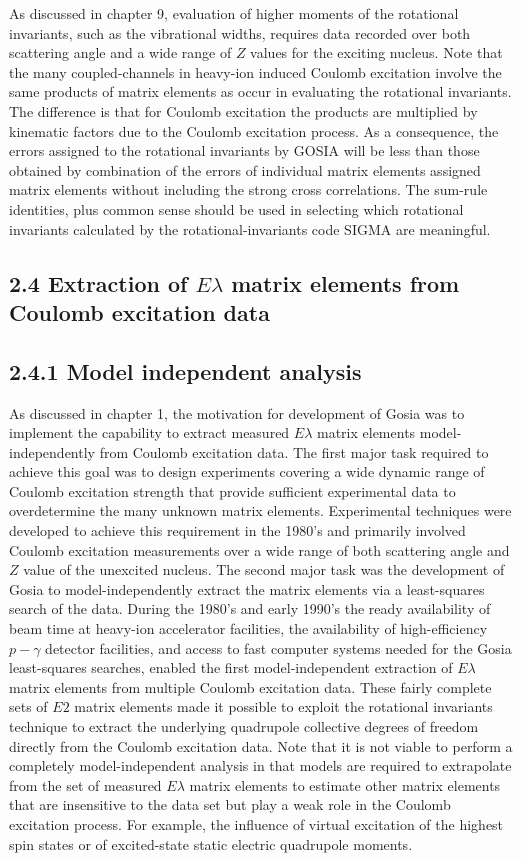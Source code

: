 \documentclass[10pt]{article}
\begin{document}
As discussed in chapter 9, evaluation of higher moments of the rotational invariants, such as the vibrational widths, requires data recorded over both scattering angle and a wide range of $Z$ values for the exciting nucleus. Note that the many coupled-channels in heavy-ion induced Coulomb excitation involve the same products of matrix elements as occur in evaluating the rotational invariants. The difference is that for Coulomb excitation the products are multiplied by kinematic factors due to the Coulomb excitation process. As a consequence, the errors assigned to the rotational invariants by GOSIA will be less than those obtained by combination of the errors of individual matrix elements assigned matrix elements without including the strong cross correlations. The sum-rule identities, plus common sense should be used in selecting which rotational invariants calculated by the rotational-invariants code SIGMA are meaningful.

\subsection*{2.4 Extraction of $E \lambda$ matrix elements from Coulomb excitation data}
\subsection*{2.4.1 Model independent analysis}
As discussed in chapter 1, the motivation for development of Gosia was to implement the capability to extract measured $E \lambda$ matrix elements model-independently from Coulomb excitation data. The first major task required to achieve this goal was to design experiments covering a wide dynamic range of Coulomb excitation strength that provide sufficient experimental data to overdetermine the many unknown matrix elements. Experimental techniques were developed to achieve this requirement in the 1980's and primarily involved Coulomb excitation measurements over a wide range of both scattering angle and $Z$ value of the unexcited nucleus. The second major task was the development of Gosia to model-independently extract the matrix elements via a least-squares search of the data. During the 1980's and early 1990's the ready availability of beam time at heavy-ion accelerator facilities, the availability of high-efficiency $p-\gamma$ detector facilities, and access to fast computer systems needed for the Gosia least-squares searches, enabled the first model-independent extraction of $E \lambda$ matrix elements from multiple Coulomb excitation data. These fairly complete sets of $E 2$ matrix elements made it possible to exploit the rotational invariants technique to extract the underlying quadrupole collective degrees of freedom directly from the Coulomb excitation data. Note that it is not viable to perform a completely model-independent analysis in that models are required to extrapolate from the set of measured $E \lambda$ matrix elements to estimate other matrix elements that are insensitive to the data set but play a weak role in the Coulomb excitation process. For example, the influence of virtual excitation of the highest spin states or of excited-state static electric quadrupole moments.
\end{document}
